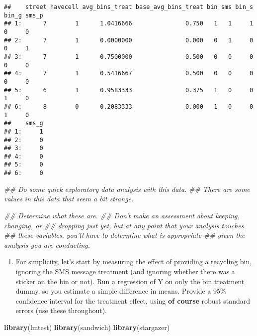 \documentclass[
]{article}
\newenvironment{Shaded}{\begin{snugshade}}{\end{snugshade}}
\newcommand{\CommentTok}[1]{\textcolor[rgb]{0.56,0.35,0.01}{\textit{#1}}}
\newcommand{\KeywordTok}[1]{\textcolor[rgb]{0.13,0.29,0.53}{\textbf{#1}}}
\newcommand{\NormalTok}[1]{#1}
\providecommand{\tightlist}{%
  \setlength{\itemsep}{0pt}\setlength{\parskip}{0pt}}
\begin{document}
\begin{verbatim}
##    street havecell avg_bins_treat base_avg_bins_treat bin sms bin_s bin_g sms_p
## 1:      7        1      1.0416666               0.750   1   1     1     0     0
## 2:      7        1      0.0000000               0.000   0   1     0     0     1
## 3:      7        1      0.7500000               0.500   0   0     0     0     0
## 4:      7        1      0.5416667               0.500   0   0     0     0     0
## 5:      6        1      0.9583333               0.375   1   0     0     1     0
## 6:      8        0      0.2083333               0.000   1   0     0     1     0
##    sms_g
## 1:     1
## 2:     0
## 3:     0
## 4:     0
## 5:     0
## 6:     0
\end{verbatim}

\begin{Shaded}
\begin{Highlighting}[]
\CommentTok{## Do some quick exploratory data analysis with this data. }
\CommentTok{## There are some values in this data that seem a bit strange. }

\CommentTok{## Determine what these are. }
\CommentTok{## Don't make an assessment about keeping, changing, or }
\CommentTok{## dropping just yet, but at any point that your analysis touches }
\CommentTok{## these variables, you'll have to determine what is appropriate }
\CommentTok{## given the analysis you are conducting. }
\end{Highlighting}
\end{Shaded}

\begin{enumerate}
\def\labelenumi{\arabic{enumi}.}
\tightlist
\item
  For simplicity, let's start by measuring the effect of providing a
  recycling bin, ignoring the SMS message treatment (and ignoring
  whether there was a sticker on the bin or not). Run a regression of Y
  on only the bin treatment dummy, so you estimate a simple difference
  in means. Provide a 95\% confidence interval for the treatment effect,
  using \textbf{of course} robust standard errors (use these
  throughout).
\end{enumerate}

\begin{Shaded}
\begin{Highlighting}[]
\KeywordTok{library}\NormalTok{(lmtest)}
\KeywordTok{library}\NormalTok{(sandwich)}
\KeywordTok{library}\NormalTok{(stargazer)}
\end{Highlighting}
\end{Shaded}
\end{document}
